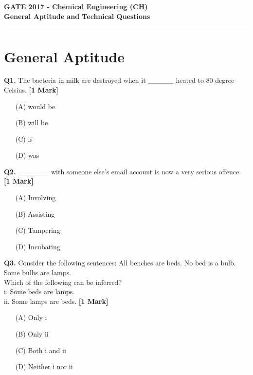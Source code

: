 \documentclass[11pt]{article}
\newcommand{\questiona}[2]{
    \noindent\textbf{Q#2.} #1 \hfill \textbf{[1 Mark]}
}
\begin{document}
\begin{center}
    \Large\textbf{GATE 2017 - Chemical Engineering (CH)} \\
    \large\textbf{General Aptitude and Technical Questions} \\
    \rule{\textwidth}{0.5pt} %
\end{center}

\vspace{0.5cm}


\section*{General Aptitude}

\questiona{The bacteria in milk are destroyed when it \_\_\_\_\_ heated to 80 degree Celsius.}{1}
\begin{enumerate}
    \item[(A)] would be  
    \item[(B)] will be  
    \item[(C)] is  
    \item[(D)] was  
\end{enumerate}
\vspace{0.5cm}

\questiona{\_\_\_\_\_\_ with someone else’s email account is now a very serious offence.}{2}
\begin{enumerate}
    \item[(A)] Involving  
    \item[(B)] Assisting
    \item[(C)] Tampering 
    \item[(D)]Incubating
\end{enumerate}
\vspace{0.5cm}

\questiona{Consider the following sentences: All benches are beds. No bed is a bulb. Some bulbs are lamps. \\ Which of the following can be inferred? \\ i. Some beds are lamps. \\ ii. Some lamps are beds.}{3}
\begin{enumerate}
    \item[(A)] Only i  
    \item[(B)] Only ii  
    \item[(C)] Both i and ii  
    \item[(D)] Neither i nor ii  
\end{enumerate}
\vspace{0.5cm}
\end{document}
